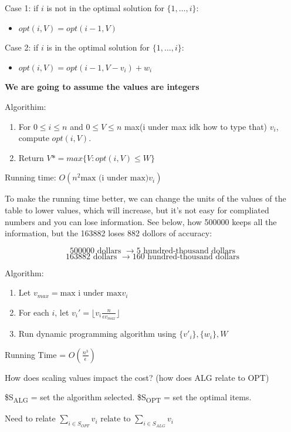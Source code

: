 \documentclass[11pt]{article}
\begin{document}
Case 1: if \(i\) is not in the optimal solution for \(\{ 1, \ldots, i\}\):
\begin{itemize}
\item \(opt(i,V) = opt(i-1,V)\)
\end{itemize}

Case 2: if \(i\) is in the optimal solution for \(\{ 1, \ldots, i\}\):
\begin{itemize}
\item \(opt(i,V) = opt(i-1,V- v_i) + w_i\)
\end{itemize}

\textbf{\textbf{We are going to assume the values are integers}}

Algorithim: 
\begin{enumerate}
\item For \(0 \leq i \leq n\) and \(0 \leq V \leq n\) max(i under max idk how to type that) \(v_i\), compute \(opt(i,V)\).
\item Return \(V* = max \{ V: opt(i,V) \leq W \}\)
\end{enumerate}

Running time: \(O(n^2 \text{max (i under max)} v_i)\)

To make the running time better, we can change the units of the values of the table to lower values, which will increase, but it's not easy for compliated numbers and you can lose information. See below, how 500000 keeps all the information, but the 163882 loses 882 dollors of accuracy:

\[ 500000 \text{ dollars } \rightarrow 5 \text{ hundred-thousand dollars} \]
\[ 163882 \text{ dollars } \rightarrow 160 \text{ hundred-thousand dollars} \]


Algorithm:
\begin{enumerate}
\item Let \(v_{max} = \text{max i under max} v_i\)
\item For each \(i\), let \(v_i' = \lfloor v_i \frac{n}{\epsilon v_{max}} \rfloor\)
\item Run dynamic programming algorithm using \(\{v'_i\},\{w_i\}, W\)
\end{enumerate}

Running Time = \(O\left( \frac{n^3}{\epsilon}\right)\)

How does scaling values impact the cost? (how does ALG relate to OPT)

\$S\textsubscript{ALG} = set the algorithm selected.
\$S\textsubscript{OPT} = set the optimal items.

Need to relate \(\sum_{i \in S_{OPT}} v_i \text{ relate to }  \sum_{i \in S_{ALG}} v_i\)
\end{document}
